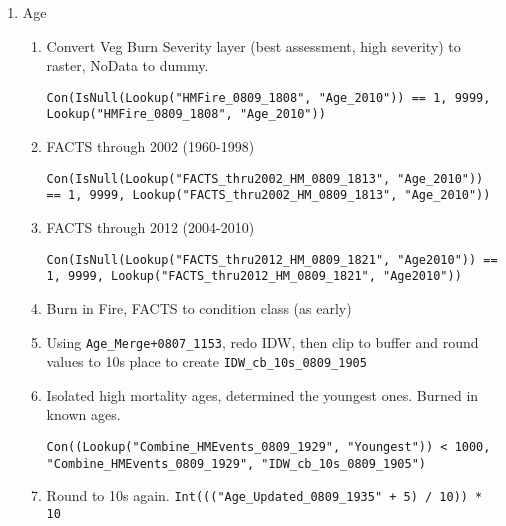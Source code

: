 \begin{enumerate}
\begin{enumerate}
\begin{lstlisting}
 \end{lstlisting}
    \end{enumerate}
    \item Age
    \begin{enumerate}
    \item Convert Veg Burn Severity layer (best assessment, high severity) to raster, NoData to dummy.
    \begin{lstlisting}
Con(IsNull(Lookup("HMFire_0809_1808", "Age_2010")) == 1, 9999, Lookup("HMFire_0809_1808", "Age_2010")) \end{lstlisting}
    \item FACTS through 2002 (1960-1998)
    \begin{lstlisting}
Con(IsNull(Lookup("FACTS_thru2002_HM_0809_1813", "Age_2010")) == 1, 9999, Lookup("FACTS_thru2002_HM_0809_1813", "Age_2010")) \end{lstlisting}
    \item FACTS through 2012 (2004-2010)
    \begin{lstlisting}
Con(IsNull(Lookup("FACTS_thru2012_HM_0809_1821", "Age2010")) == 1, 9999, Lookup("FACTS_thru2012_HM_0809_1821", "Age2010")) \end{lstlisting}
    \item Burn in Fire, FACTS to condition class (as early)
    \item Using \lstinline{Age_Merge+0807_1153}, redo IDW, then clip to buffer and round values to 10s place to create \lstinline{IDW_cb_10s_0809_1905}
    \item Isolated high mortality ages, determined the youngest ones. Burned in known ages. \begin{lstlisting}
Con((Lookup("Combine_HMEvents_0809_1929", "Youngest")) < 1000, "Combine_HMEvents_0809_1929", "IDW_cb_10s_0809_1905") \end{lstlisting}
    \item Round to 10s again. \lstinline{Int((("Age_Updated_0809_1935" + 5) / 10)) * 10}
    \end{enumerate}
\end{enumerate}

